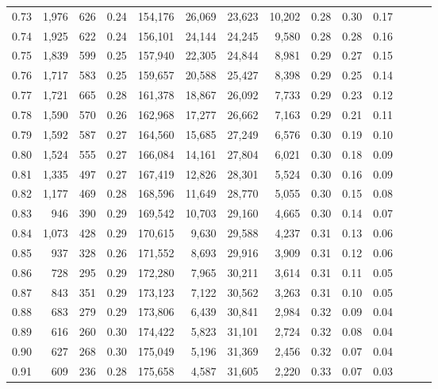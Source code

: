 \begin{tabular}{rrrrrrrrrrrrrr}
0.73 &  1,976 &  626 &  0.24 &  154,176 &   26,069 &  23,623 &  10,202 &  0.28 &  0.30 &      0.17 \\
0.74 &  1,925 &  622 &  0.24 &  156,101 &   24,144 &  24,245 &   9,580 &  0.28 &  0.28 &      0.16 \\
0.75 &  1,839 &  599 &  0.25 &  157,940 &   22,305 &  24,844 &   8,981 &  0.29 &  0.27 &      0.15 \\
0.76 &  1,717 &  583 &  0.25 &  159,657 &   20,588 &  25,427 &   8,398 &  0.29 &  0.25 &      0.14 \\
0.77 &  1,721 &  665 &  0.28 &  161,378 &   18,867 &  26,092 &   7,733 &  0.29 &  0.23 &      0.12 \\
0.78 &  1,590 &  570 &  0.26 &  162,968 &   17,277 &  26,662 &   7,163 &  0.29 &  0.21 &      0.11 \\
0.79 &  1,592 &  587 &  0.27 &  164,560 &   15,685 &  27,249 &   6,576 &  0.30 &  0.19 &      0.10 \\
0.80 &  1,524 &  555 &  0.27 &  166,084 &   14,161 &  27,804 &   6,021 &  0.30 &  0.18 &      0.09 \\
0.81 &  1,335 &  497 &  0.27 &  167,419 &   12,826 &  28,301 &   5,524 &  0.30 &  0.16 &      0.09 \\
0.82 &  1,177 &  469 &  0.28 &  168,596 &   11,649 &  28,770 &   5,055 &  0.30 &  0.15 &      0.08 \\
0.83 &    946 &  390 &  0.29 &  169,542 &   10,703 &  29,160 &   4,665 &  0.30 &  0.14 &      0.07 \\
0.84 &  1,073 &  428 &  0.29 &  170,615 &    9,630 &  29,588 &   4,237 &  0.31 &  0.13 &      0.06 \\
0.85 &    937 &  328 &  0.26 &  171,552 &    8,693 &  29,916 &   3,909 &  0.31 &  0.12 &      0.06 \\
0.86 &    728 &  295 &  0.29 &  172,280 &    7,965 &  30,211 &   3,614 &  0.31 &  0.11 &      0.05 \\
0.87 &    843 &  351 &  0.29 &  173,123 &    7,122 &  30,562 &   3,263 &  0.31 &  0.10 &      0.05 \\
0.88 &    683 &  279 &  0.29 &  173,806 &    6,439 &  30,841 &   2,984 &  0.32 &  0.09 &      0.04 \\
0.89 &    616 &  260 &  0.30 &  174,422 &    5,823 &  31,101 &   2,724 &  0.32 &  0.08 &      0.04 \\
0.90 &    627 &  268 &  0.30 &  175,049 &    5,196 &  31,369 &   2,456 &  0.32 &  0.07 &      0.04 \\
0.91 &    609 &  236 &  0.28 &  175,658 &    4,587 &  31,605 &   2,220 &  0.33 &  0.07 &      0.03 \\

\end{tabular}
